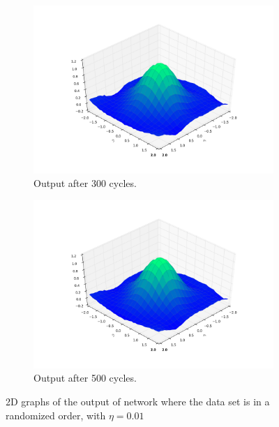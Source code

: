 \documentclass[a4paper,10pt]{article}
\numberwithin{equation}{section} %
\numberwithin{figure}{section} %
\numberwithin{table}{section} %
\theoremstyle{mytheor}
\begin{document}
\begin{enumerate}
\begin{figure}[h!]
\begin{subfigure}[b]{0.45\textwidth}
				\includegraphics[width=\textwidth]{ex2_4llr_300.png}\vspace{-0.5cm}
				\caption{Output after 300 cycles.}
			\end{subfigure}
			\begin{subfigure}[b]{0.45\textwidth}
				\includegraphics[width=\textwidth]{ex2_4llr_500.png}\vspace{-0.5cm}
				\caption{Output after 500 cycles.}
			\end{subfigure}
   			\caption{\vspace{-0.1cm} 2D graphs of the output of network where the data set is in a randomized order, with $\eta = 0.01$}\vspace{-0.2cm}
  		\end{figure}
		

\end{enumerate}
\end{document}
